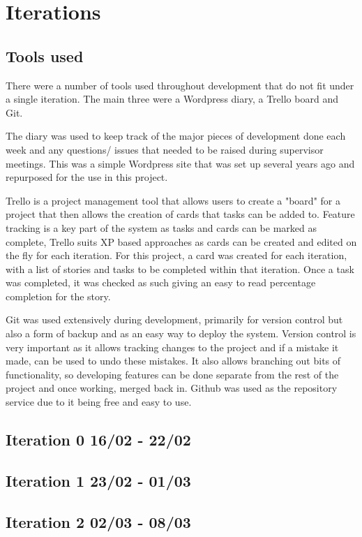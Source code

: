 \chapter{Iterations}
\section{Tools used}
There were a number of tools used throughout development that do not fit under a single iteration. The main three were a Wordpress diary, a Trello board and Git. 

The diary was used to keep track of the major pieces of development done each week and any questions/ issues that needed to be raised during supervisor meetings. This was a simple Wordpress site that was set up several years ago and repurposed for the use in this project.

Trello is a project management tool that allows users to create a "board" for a project that then allows the creation of cards that tasks can be added to\cite{trello}. Feature tracking is a key part of the system as tasks and cards can be marked as complete, Trello suits XP based approaches as cards can be created and edited on the fly for each iteration. For this project, a card was created for each iteration, with a list of stories and tasks to be completed within that iteration. Once a task was completed, it was checked as such giving an easy to read percentage completion for the story.

Git was used extensively during development, primarily for version control but also a form of backup and as an easy way to deploy the system. Version control is very important as it allows tracking changes to the project and if a mistake it made, can be used to undo these mistakes. It also allows branching out bits of functionality, so developing features can be done separate from the rest of the project and once working, merged back in. Github was used as the repository service due to it being free and easy to use\cite{github}.
\section{Iteration 0 16/02 - 22/02}


\section{Iteration 1 23/02 - 01/03}


\section{Iteration 2 02/03 - 08/03}


